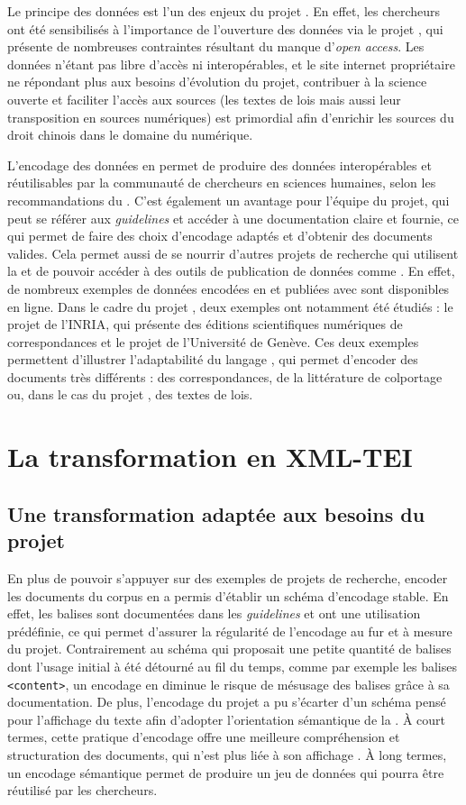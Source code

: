 Le principe \fair des données est l'un des enjeux du projet \COREL. En effet, les chercheurs ont été sensibilisés à l'importance de l'ouverture des données via le projet \LSC, qui présente de nombreuses contraintes résultant du manque d'\textit{open access}. Les données \XML n'étant pas libre d'accès ni interopérables, et le site internet propriétaire ne répondant plus aux besoins d'évolution du projet, contribuer à la science ouverte et faciliter l'accès aux sources (les textes de lois mais aussi leur transposition en sources numériques) est primordial afin d'enrichir les sources du droit chinois dans le domaine du numérique. 

L'encodage des données en \TEI permet de produire des données interopérables et réutilisables par la communauté de chercheurs en sciences humaines, selon les recommandations du \wc. C'est également un avantage pour l'équipe du projet, qui peut se référer aux \textit{guidelines} et accéder à une documentation claire et fournie, ce qui permet de faire des choix d'encodage adaptés et d'obtenir des documents \TEI valides. Cela permet aussi de se nourrir d'autres projets de recherche qui utilisent la \TEI et de pouvoir accéder à des outils de publication de données comme \tp. En effet, de nombreux exemples de données encodées en \TEI et publiées avec \tp sont disponibles en ligne. Dans le cadre du projet \COREL, deux exemples ont notamment été étudiés : le projet \disco de l'INRIA, qui présente des éditions scientifiques numériques de correspondances et le projet \cordel de l'Université de Genève. Ces deux exemples permettent d'illustrer l'adaptabilité du langage \TEI, qui permet d'encoder des documents très différents : des correspondances, de la littérature de colportage ou, dans le cas du projet \COREL, des textes de lois. 

 \section{La transformation en XML-TEI}
    \subsection{Une transformation adaptée aux besoins du projet}
    
En plus de pouvoir s'appuyer sur des exemples de projets de recherche, encoder les documents du corpus en \TEI a permis d'établir un schéma d'encodage stable. En effet, les balises \TEI sont documentées dans les \textit{guidelines} et ont une utilisation prédéfinie, ce qui permet d'assurer la régularité de l'encodage au fur et à mesure du projet. Contrairement au schéma \LSC qui proposait une petite quantité de balises dont l'usage initial à été détourné au fil du temps, comme par exemple les balises \texttt{<content>}, un encodage en \TEI diminue le risque de mésusage des balises grâce à sa documentation. De plus, l'encodage du projet a pu s'écarter d'un schéma pensé pour l'affichage du texte afin d'adopter l'orientation sémantique de la \TEI. À court termes, cette pratique d'encodage offre une meilleure compréhension et structuration des documents, qui n'est plus liée à son affichage \HTML. À long termes, un encodage sémantique permet de produire un jeu de données qui pourra être réutilisé par les chercheurs. 

